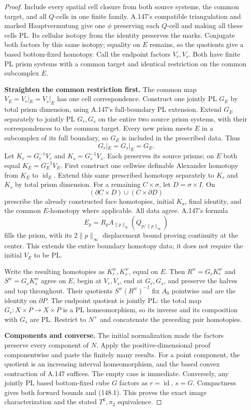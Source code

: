 \begin{proof}
Include every spatial cell closure from both source systems, the
common target, and all \(Q\)-cells in one finite family. A.147's
compatible triangulation and marked Hauptvermutung give one
\(\phi\) preserving each \(Q\)-cell and making all these cells PL.
Its cellular isotopy from the identity preserves the marks.
Conjugate both factors by this same isotopy; equality on \(E\) remains,
so the quotients give a based bottom-fixed homotopy. Call the endpoint
factors \(V_r,V_s\). Both have finite PL prism systems with a common
target and identical restriction on the common subcomplex \(E\).

\textbf{Straighten the common restriction first.}
The common map \(V_E=V_r|_E=V_s|_E\) has one cell correspondence.
Construct one jointly PL \(G_E\) by total prism dimension, using
A.147's full-boundary PL extension. Extend \(G_E\) separately to
jointly PL \(G_r,G_s\) on the entire two source prism systems,
with their correspondences to the common target. Every new prism
meets \(E\) in a subcomplex of its full boundary, so \(G_E\) is
included in the prescribed data. Thus
\[
 G_r|_E=G_s|_E=G_E.
 \tag{148.4}
\]
Let \(K_r=G_r^{-1}V_r\) and \(K_s=G_s^{-1}V_s\).
Each preserves its source prisms; on \(E\) both equal
\(K_E=G_E^{-1}V_E\). First construct one cellwise definable
Alexander homotopy from \(K_E\) to \(\operatorname{id}_E\).
Extend this same prescribed homotopy separately to \(K_r\) and
\(K_s\) by total prism dimension. For a remaining \(C\times\sigma\),
let \(D=\sigma\times I\). On
\[
 (\partial C\times D)\cup(C\times\partial D)
\]
prescribe the already constructed face homotopies, initial \(K_a\),
final identity, and the common \(E\)-homotopy where applicable.
All data agree. A.147's formula
\[
 E_p=R_p A_{\|p\|_\infty}(Q_{p/\|p\|_\infty})
\]
fills the prism, with its \(2\|p\|_\infty\) displacement bound
proving continuity at the center. This extends the entire boundary
homotopy data; it does not require the initial \(V_E\) to be PL.

Write the resulting homotopies as \(K_r^w,K_s^w\), equal on \(E\).
Then \(R^w=G_rK_r^w\) and \(S^w=G_sK_s^w\) agree on \(E\), begin
at \(V_r,V_s\), end at \(G_r,G_s\), and preserve the halves and top
throughout. Their quotients \(S^w(R^w)^{-1}\) fix \(A_0\) pointwise
and are the identity on \(\partial P\).
The endpoint quotient is jointly PL: the total map
\(G_r:X\times P\to X\times P\) is a PL homeomorphism, so its inverse
and its composition with \(G_s\) are PL. Restrict to \(N^+\) and
concatenate the preceding pair homotopies.

\textbf{Components and converse.}
The initial normalization made the factors preserve every component
of \(N\). Apply the positive-dimensional proof componentwise and
paste the finitely many results. For a point component, the quotient
is an increasing interval homeomorphism, and the based convex
contraction of A.147 suffices. The empty case is immediate.
Conversely, any jointly PL based bottom-fixed cube \(G\) factors as
\(r=\operatorname{id}\), \(s=G\). Compactness gives both forward
bounds and (148.1). This proves the exact image characterization
and the stated \(T^6,\pi_2\) equivalence.
\end{proof}

